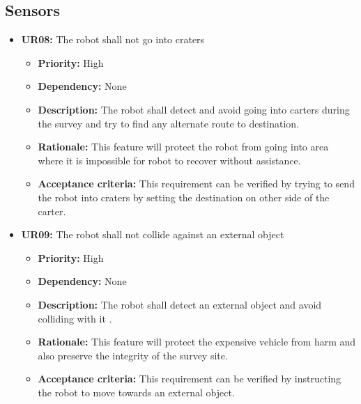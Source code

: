 \documentclass[10pt,a4paper,titlepage]{article}
\begin{document}
	\subsection{Sensors}
  
    \begin{itemize}
		\item \textbf{UR08:} The robot shall not go into craters
		\begin{itemize}
			\item \textbf{Priority:} High
            \item \textbf{Dependency:} None
			\item \textbf{Description:} The robot shall detect and avoid going into carters during the survey and try to find any alternate route to destination. 
            \item \textbf{Rationale:} This feature will protect the robot from going into area where it is impossible for robot to recover without assistance. 
            \item \textbf{Acceptance criteria:} This requirement can be verified by trying to send the robot into craters by setting the destination on other side of the carter. 
		\end{itemize} 
	\end{itemize}  
    \begin{itemize}
		\item \textbf{UR09:} The robot shall not collide against an external object
		\begin{itemize}
			\item \textbf{Priority:} High
            \item \textbf{Dependency:} None
			\item \textbf{Description:} The robot shall detect an external object and avoid colliding with it . 
            \item \textbf{Rationale:} This feature will protect the expensive vehicle from harm and also preserve the integrity of the survey site. 
            \item \textbf{Acceptance criteria:} This requirement can be verified by instructing the robot to move towards an external object. 
		\end{itemize} 
	\end{itemize}
\end{document}
